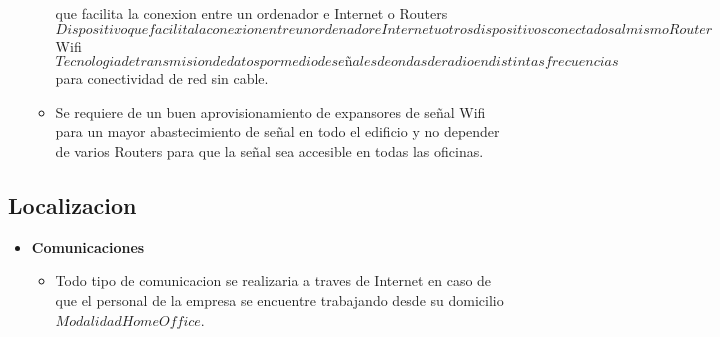 \documentclass[
10pt, %
a4paper, %
oneside, %
headinclude,footinclude, %
BCOR5mm, %
]{scrartcl}
\begin{document}
\begin{itemize}
\begin{itemize}
            que facilita la conexion entre un ordenador e Internet \) o
            Routers \( Dispositivo que facilita la conexion entre un
            ordenador e Internet u otros dispositivos conectados al mismo
            Router \) Wifi \( Tecnologia de transmision de datos por medio de
            señales de ondas de radio en distintas frecuencias \) para
            conectividad de red sin cable.
    \item Se requiere de un buen aprovisionamiento de expansores de señal Wifi
            para un mayor abastecimiento de señal en todo el edificio y
            no depender de varios Routers para que la señal sea accesible en
            todas las oficinas.
  \end{itemize}
\end{itemize}

\subsection{Localizacion}
\begin{itemize}
  \item \textbf {Comunicaciones}
  \begin{itemize}
    \item Todo tipo de comunicacion se realizaria a traves de Internet en caso
            de que el personal de la empresa se encuentre trabajando desde su
            domicilio \(Modalidad Home Office\).
  \end{itemize}
\end{itemize}
\end{document}
